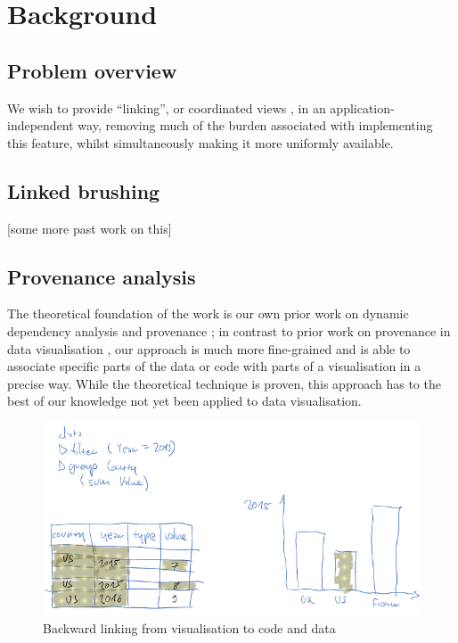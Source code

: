 \section{Background}
\label{sec:background}

\subsection{Problem overview}
We wish to provide ``linking'', or coordinated views \cite{tobiasz09}, in an
application-independent way, removing much of the burden associated with
implementing this feature, whilst simultaneously making it more uniformly
available.

\subsection{Linked brushing}
[some more past work on this]

\subsection{Provenance analysis}
The theoretical foundation of the work is our own prior work on
dynamic dependency analysis and provenance \cite{perera16d, ricciotti17}; in
contrast to prior work on provenance in data visualisation \cite{callahan06},
our approach is much more fine-grained and is able to associate specific parts
of the data or code with parts of a visualisation in a precise way. While the
theoretical technique is proven, this approach has to the best of our knowledge
not yet been applied to data visualisation.

\newpage

\begin{figure}[h]
\includegraphics[scale=0.35]{image/chart-bwd}
\caption{Backward linking from visualisation to code and data}
\end{figure}
